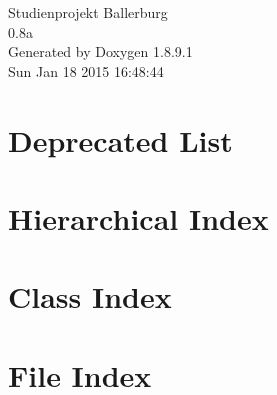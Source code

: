 \documentclass[twoside]{book}
\newcommand{\+}{\discretionary{\mbox{\scriptsize$\hookleftarrow$}}{}{}}
\newcommand{\clearemptydoublepage}{%
  \newpage{\pagestyle{empty}\cleardoublepage}%
}
\begin{document}
\begin{titlepage}
\vspace*{7cm}
\begin{center}%
{\Large Studienprojekt Ballerburg \\[1ex]\large 0.\+8a }\\
\vspace*{1cm}
{\large Generated by Doxygen 1.8.9.1}\\
\vspace*{0.5cm}
{\small Sun Jan 18 2015 16:48:44}\\
\end{center}
\end{titlepage}
\clearemptydoublepage
\tableofcontents
\clearemptydoublepage
{}

\chapter{Deprecated List}
\label{deprecated}

\chapter{Hierarchical Index}

\chapter{Class Index}

\chapter{File Index}

\end{document}
